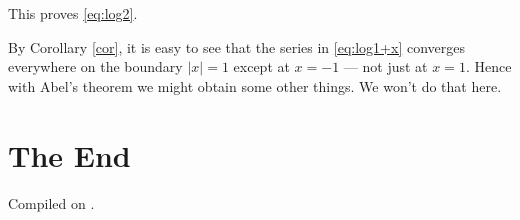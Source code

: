 \documentclass{article}
\begin{document}
This proves \eqref{eq:log2}.

By Corollary \ref{cor}, it is easy to see that the series in \eqref{eq:log1+x} converges everywhere on the boundary $\vert x\vert = 1$ except at $x=-1$ --- not just at $x=1$. Hence with Abel's theorem we might obtain some other things. We won't do that here.

\section*{The End}

\noindent Compiled on \todayymd.

\noindent\home
\end{document}
